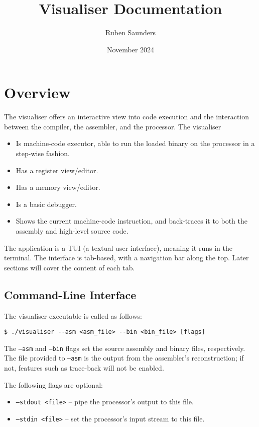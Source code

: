 \documentclass[10pt]{article}
\title{Visualiser Documentation}
\author{Ruben Saunders}
\date{November 2024}
\begin{document}
    \maketitle
    \tableofcontents

    \newpage

    \section{Overview}

    The visualiser offers an interactive view into code execution and the interaction between the compiler, the assembler, and the processor.
    The visualiser
    \begin{itemize}
        \item Is machine-code executor, able to run the loaded binary on the processor in a step-wise fashion.
        \item Has a register view/editor.
        \item Has a memory view/editor.
        \item Is a basic debugger.
        \item Shows the current machine-code instruction, and back-traces it to both the assembly and high-level source code.
    \end{itemize}

    The application is a TUI (a textual user interface), meaning it runs in the terminal.
    The interface is tab-based, with a navigation bar along the top.
    Later sections will cover the content of each tab.

    \subsection{Command-Line Interface}

    The visualiser executable is called as follows:

    \medskip
    \begin{lstlisting}[style=bashconsole]
$ ./visualiser --asm <asm_file> --bin <bin_file> [flags]
    \end{lstlisting}

    The \texttt{--asm} and \texttt{--bin} flags set the source assembly and binary files, respectively.
    The file provided to \texttt{--asm} is the output from the assembler's reconstruction; if not, features such as trace-back will not be enabled.

    The following flags are optional:
    \begin{itemize}
        \item \texttt{--stdout <file>} -- pipe the processor's output to this file.
        \item \texttt{--stdin <file>} -- set the processor's input stream to this file.
    \end{itemize}
\end{document}
